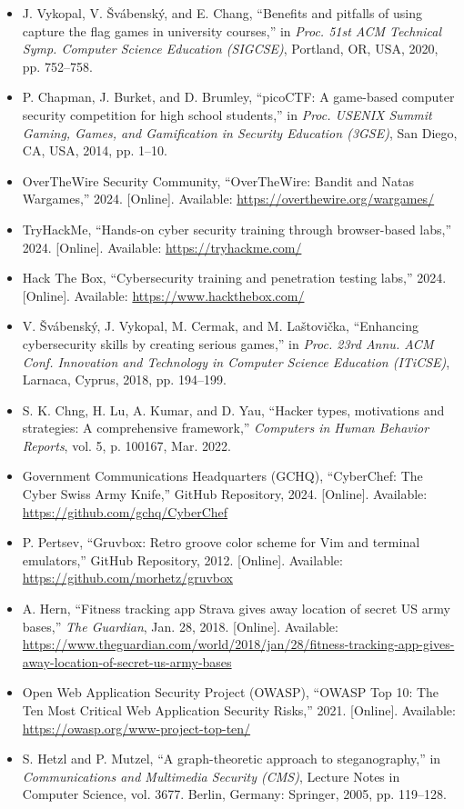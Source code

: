 \documentclass[11pt,a4paper]{article}
\begin{document}
\begin{itemize}[label={}, leftmargin=0pt, itemsep=0.65em]
    \item J. Vykopal, V. Švábenský, and E. Chang, ``Benefits and pitfalls of using capture the flag games in university courses,'' in \textit{Proc. 51st ACM Technical Symp. Computer Science Education (SIGCSE)}, Portland, OR, USA, 2020, pp. 752--758.
    \item P. Chapman, J. Burket, and D. Brumley, ``picoCTF: A game-based computer security competition for high school students,'' in \textit{Proc. USENIX Summit Gaming, Games, and Gamification in Security Education (3GSE)}, San Diego, CA, USA, 2014, pp. 1--10.
    \item OverTheWire Security Community, ``OverTheWire: Bandit and Natas Wargames,'' 2024. [Online]. Available: \url{https://overthewire.org/wargames/}
    \item TryHackMe, ``Hands-on cyber security training through browser-based labs,'' 2024. [Online]. Available: \url{https://tryhackme.com/}
    \item Hack The Box, ``Cybersecurity training and penetration testing labs,'' 2024. [Online]. Available: \url{https://www.hackthebox.com/}
    \item V. Švábenský, J. Vykopal, M. Cermak, and M. Laštovička, ``Enhancing cybersecurity skills by creating serious games,'' in \textit{Proc. 23rd Annu. ACM Conf. Innovation and Technology in Computer Science Education (ITiCSE)}, Larnaca, Cyprus, 2018, pp. 194--199.
    \item S. K. Chng, H. Lu, A. Kumar, and D. Yau, ``Hacker types, motivations and strategies: A comprehensive framework,'' \textit{Computers in Human Behavior Reports}, vol. 5, p. 100167, Mar. 2022.
    \item Government Communications Headquarters (GCHQ), ``CyberChef: The Cyber Swiss Army Knife,'' GitHub Repository, 2024. [Online]. Available: \url{https://github.com/gchq/CyberChef}
    \item P. Pertsev, ``Gruvbox: Retro groove color scheme for Vim and terminal emulators,'' GitHub Repository, 2012. [Online]. Available: \url{https://github.com/morhetz/gruvbox}
    \item A. Hern, ``Fitness tracking app Strava gives away location of secret US army bases,'' \textit{The Guardian}, Jan. 28, 2018. [Online]. Available: \url{https://www.theguardian.com/world/2018/jan/28/fitness-tracking-app-gives-away-location-of-secret-us-army-bases}
    \item Open Web Application Security Project (OWASP), ``OWASP Top 10: The Ten Most Critical Web Application Security Risks,'' 2021. [Online]. Available: \url{https://owasp.org/www-project-top-ten/}
    \item S. Hetzl and P. Mutzel, ``A graph-theoretic approach to steganography,'' in \textit{Communications and Multimedia Security (CMS)}, Lecture Notes in Computer Science, vol. 3677. Berlin, Germany: Springer, 2005, pp. 119--128.
\end{itemize}
\end{document}
